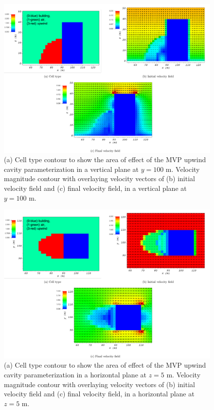 \begin{figure}[H]
    \centering
    \includegraphics[width=\textwidth]{Images/upwind_y_100_2.pdf}
    \caption{(a) Cell type contour to show the area of effect of the MVP upwind cavity parameterization in a vertical plane at $y=100$ m. Velocity magnitude contour with overlaying velocity vectors of (b) initial velocity field and (c) final velocity field, in a vertical plane at $y=100$ m.}
\end{figure}

\begin{figure}[H]
    \centering
    \includegraphics[width=\textwidth]{Images/upwind_z_5_2.pdf}
    \caption{(a) Cell type contour to show the area of effect of the MVP upwind cavity parameterization in a horizontal plane at $z=5$ m. Velocity magnitude contour with overlaying velocity vectors of (b) initial velocity field and (c) final velocity field, in a horizontal plane at $z=5$ m.}
\end{figure}

